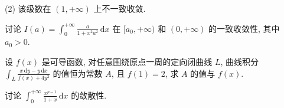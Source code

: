 (2) 该级数在 $(1, +\infty)$ 上不一致收敛.\par
\par{}
讨论 $I(a) = \int_{0}^{+\infty} \frac{a}{1 + x^2 a^2} \, \mathrm{d}x$ 在 $[a_0, +\infty)$ 和 $(0, +\infty)$ 的一致收敛性, 其中 $a_0 > 0$.\par
\par{}
设 $f(x)$ 是可导函数, 对任意围绕原点一周的定向闭曲线 $L$, 曲线积分 $\int_{L} \frac{x \, \mathrm{d}y - y \, \mathrm{d}x}{f(x) + 4y^2}$ 的值恒为常数 $A$, 且 $f(1) = 2$, 求 $A$ 的值与 $f(x)$.\par
\par{}
讨论 $\int_0^{+\infty} \frac{x^{p-1}}{1 + x} \, \mathrm{d}x$ 的敛散性.\par
